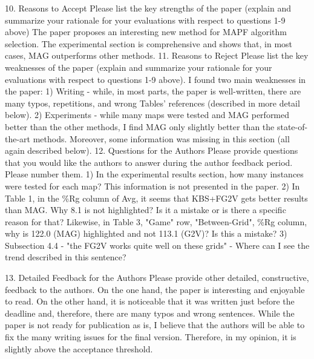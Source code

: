 10. {Reasons to Accept} Please list the key strengths of the paper (explain and summarize your rationale for your evaluations with respect to questions 1-9 above)
The paper proposes an interesting new method for MAPF algorithm selection. The experimental section is comprehensive and shows that, in most cases, MAG outperforms other methods.
11. {Reasons to Reject} Please list the key weaknesses of the paper (explain and summarize your rationale for your evaluations with respect to questions 1-9 above).
I found two main weaknesses in the paper:
1) Writing - while, in most parts, the paper is well-written, there are many typos, repetitions, and wrong Tables' references (described in more detail below).
2) Experiments - while many maps were tested and MAG performed better than the other methods, I find MAG only slightly better than the state-of-the-art methods. Moreover, some information was missing in this section (all again described below).
12. {Questions for the Authors} Please provide questions that you would like the authors to answer during the author feedback period. Please number them.
1) In the experimental results section, how many instances were tested for each map? This information is not presented in the paper.
2) In Table 1, in the \%Rg column of Avg, it seems that KBS+FG2V gets better results than MAG. Why 8.1 is not highlighted? Is it a mistake or is there a specific reason for that? Likewise, in Table 3, "Game" row, "Between-Grid", \%Rg column, why is 122.0 (MAG) highlighted and not 113.1 (G2V)? Is this a mistake?
3) Subsection 4.4 - "the FG2V works quite well on these grids" - Where can I see the trend described in this sentence?

13. {Detailed Feedback for the Authors} Please provide other detailed, constructive, feedback to the authors.
On the one hand, the paper is interesting and enjoyable to read. On the other hand, it is noticeable that it was written just before the deadline and, therefore, there are many typos and wrong sentences. While the paper is not ready for publication as is, I believe that the authors will be able to fix the many writing issues for the final version. Therefore, in my opinion, it is slightly above the acceptance threshold.


